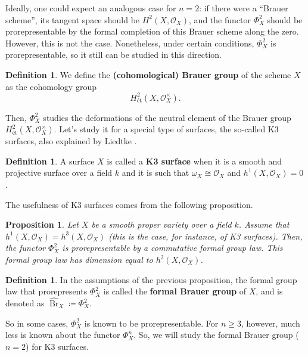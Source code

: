 \documentclass{report}
\DeclareMathOperator{\Br}{Br}
\newtheorem{proposition}[equation]{Proposition}
\theoremstyle{definition}
\newtheorem{definition}[equation]{Definition}
\begin{document}
Ideally, one could expect an analogous case for $n=2$: if there were a ``Brauer scheme'', its tangent space should be $H^2(X,\mathcal{O}_X)$, and the functor $\Phi_X^2$ should be prorepresentable by the formal completion of this Brauer scheme along the zero. However, this is not the case. Nonetheless, under certain conditions, $\Phi_X^2$ is prorepresentable, so it still can be studied in this direction.

\begin{definition}
We define the \textbf{(cohomological) Brauer group} of the scheme $X$ as the cohomology group
\[H_{\text{\'{e}t}}^2(X,\mathcal{O}_X^{\times}).\]
\end{definition}

Then, $\Phi_X^2$ studies the deformations of the neutral element of the Brauer group $H_{\text{\'{e}t}}^2(X,\mathcal{O}_X^{\times})$. Let's study it for a special type of surfaces, the so-called K3 surfaces, also explained by Liedtke \cite[Section~2]{liedtke2016lectures}.

\begin{definition}
A surface $X$ is called a \textbf{K3 surface} when it is a smooth and projective surface over a field $k$ and it is such that $\omega_X\cong\mathcal{O}_X$ and $h^1(X,\mathcal{O}_X)=0$.
\end{definition}

The usefulness of K3 surfaces comes from the following proposition.

\begin{proposition}
Let $X$ be a smooth proper variety over a field $k$. Assume that $h^1(X,\mathcal{O}_X)=h^3(X,\mathcal{O}_X)$ (this is the case, for instance, of K3 surfaces). Then, the functor $\Phi_X^2$ is prorepresentable by a commutative formal group law. This formal group law has dimension equal to $h^2(X,\mathcal{O}_X)$.
\end{proposition}

\begin{definition}
In the assumptions of the previous proposition, the formal group law that prorepresents $\Phi_X^2$ is called the \textbf{formal Brauer group} of $X$, and is denoted as $\widehat{\Br}_X\coloneqq\Phi_X^2$.
\end{definition}

So in some cases, $\Phi_X^2$ is known to be prorepresentable. For $n\geq3$, however, much less is known about the functor $\Phi_X^n$. So, we will study the formal Brauer group ($n=2$) for K3 surfaces.
\end{document}
